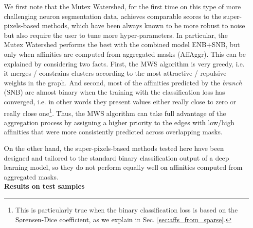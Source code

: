 We first note that the Mutex Watershed, for the first time on this type of more challenging neuron segmentation data, achieves comparable scores to the super-pixels-based methods, which have been always known to be more robust to noise but also require the user to tune more hyper-parameters.   
In particular, the Mutex Watershed performs the best with the combined model ENB+SNB, but only when affinities are computed from aggregated masks (AffAggr).
This can be explained by considering two facts. First, the MWS algorithm is very greedy, i.e. it merges / constrains clusters according to the most attractive / repulsive weights in the graph. And second, most of the affinities predicted by the \emph{\sparseBr branch} (SNB) are almost binary when the training with the classification loss has converged, i.e. in other words they present values either really close to zero or really close one\footnote{This is particularly true when the binary classification loss is based on the S\o rensen-Dice coefficient, as we explain in Sec. \ref{sec:affs_from_sparse}.}. 
Thus, the MWS algorithm can take full advantage of the \maskname aggregation process by assigning a higher priority to the edges with low/high affinities that were more consistently predicted across overlapping masks.

On the other hand, the super-pixels-based methods tested here have been designed and tailored to the standard binary classification output of a deep learning model, so they do not perform equally well on affinities computed from aggregated masks.\\



\textbf{Results on test samples} -- 



